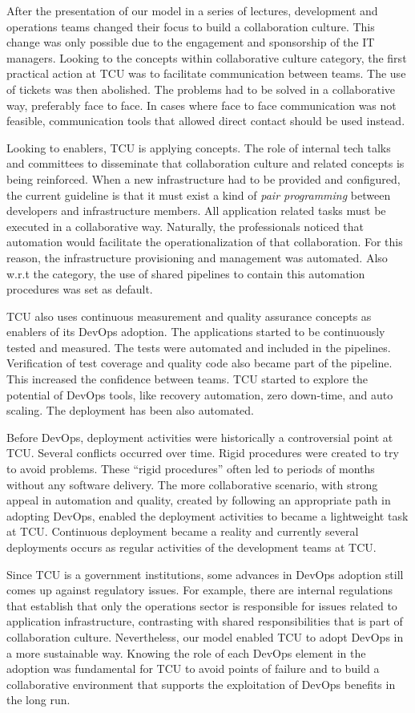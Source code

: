 After the presentation of our  model in a series of lectures, development and
operations teams changed their focus to build a collaboration culture. This
change was only possible due to the engagement and sponsorship of the IT
managers. Looking to the concepts within collaborative culture category, the first practical
action at TCU was to facilitate communication between teams. The use of tickets
was then abolished. The problems had to be solved in a collaborative way, preferably
face to face. In cases where face to face communication was not feasible,
communication tools that allowed direct contact should be used instead.

Looking to enablers, TCU is applying  concepts.
The role of internal tech talks and committees to disseminate that collaboration
culture and related concepts is being reinforced.
When a new infrastructure had to be provided and configured, the current guideline is
that it must exist a kind of \emph{pair programming} between developers and infrastructure
members. All application related tasks must be executed in a collaborative
way. Naturally, the professionals noticed that automation would facilitate the
operationalization of that collaboration. For this reason, the infrastructure provisioning
and management was automated. Also w.r.t  the  category,
the use of shared pipelines to contain this automation procedures was set as default.

TCU also uses continuous measurement and quality assurance concepts as
enablers of its DevOps adoption. The applications started to be continuously
tested and measured. The tests were automated and included in the pipelines.
Verification of test coverage and quality code also became part of the pipeline.
This increased the confidence between teams. TCU started
to explore the potential of DevOps tools, like recovery automation, zero
down-time, and auto scaling. The deployment has been also automated.

Before DevOps, deployment activities were historically a controversial point at TCU.
Several conflicts occurred over time. Rigid procedures were created to try to
avoid problems. These ``rigid procedures'' often led to periods of months
without any software delivery. The more collaborative scenario, with strong appeal in automation and quality,
created by following an appropriate path in adopting DevOps, enabled the deployment activities to became
a lightweight task at TCU. Continuous deployment became a reality and currently several deployments
occurs as regular activities of the development teams at TCU.

Since TCU is a government institutions, some advances in DevOps adoption still comes up
against regulatory issues. For example, there are internal regulations that
establish that only the operations sector is responsible for issues related to
application infrastructure, contrasting with shared responsibilities that is
part of collaboration culture. Nevertheless, our model enabled TCU to adopt DevOps in a more
sustainable way. Knowing the role
of each DevOps element in the adoption was fundamental for TCU to avoid points
of failure and to build a collaborative environment that supports the
exploitation of DevOps benefits in the long run.
